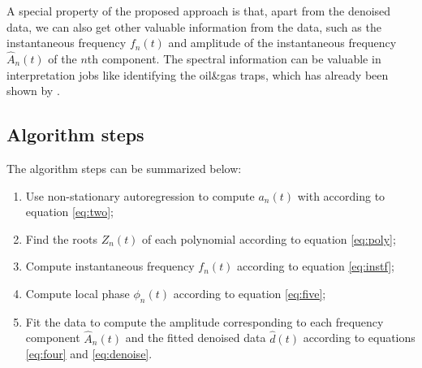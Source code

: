 A special property of the proposed approach is that, apart from the denoised data, we can also get other valuable information from the data, such as the instantaneous frequency $f_n(t)$ and amplitude of the instantaneous frequency $\hat{A}_n(t)$ of the $n$th component. The spectral information can be valuable in interpretation jobs like identifying the oil\&gas traps, which has already been shown by \cite{sdrnar}.







\subsection{Algorithm steps}
The algorithm steps can be summarized below:
\begin{enumerate}
\item Use non-stationary autoregression to compute $a_n(t)$ with  according to equation \ref{eq:two};
\item Find the roots $Z_n(t)$ of each polynomial according to equation \ref{eq:poly};
\item Compute instantaneous frequency $f_n(t)$ according to equation \ref{eq:instf};
\item Compute local phase $\phi_n(t)$ according to equation \ref{eq:five};
\item Fit the data to compute the amplitude corresponding to each frequency component $\hat{A}_n(t)$ and the fitted denoised data $\hat{d}(t)$ according to equations \ref{eq:four} and \ref{eq:denoise}.
\end{enumerate}


